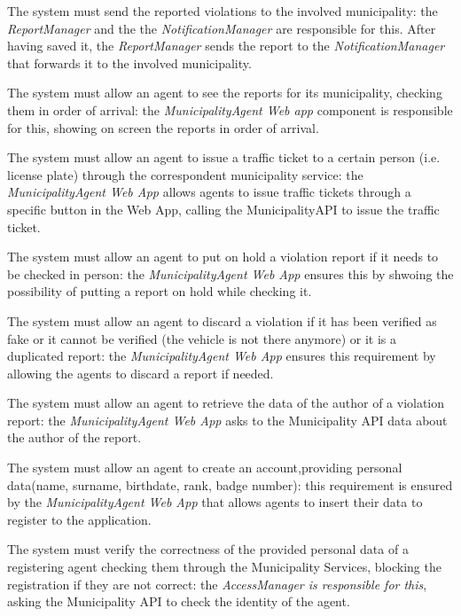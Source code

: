 \documentclass[a4paper]{report}
\begin{document}
\begin{enumerate}[start=1,label={[R\arabic*]}]
\item \label{[R18]}The system must send the reported violations to the involved municipality: the \textit{ReportManager} and the the \textit{NotificationManager} are responsible for this. After having saved it, the \textit{ReportManager} sends the report to the \textit{NotificationManager} that forwards it to the involved municipality.
\item \label{[R19]}The system must allow an agent to see the reports for its municipality, checking them in order of arrival: the \textit{MunicipalityAgent Web app} component is responsible for this, showing on screen the reports in order of arrival.
\item \label{[R20]}The system must allow an agent to issue a traffic ticket to a certain person (i.e. license plate) through the correspondent municipality service: the \textit{MunicipalityAgent Web App}  allows agents to issue traffic tickets through a specific button in the Web App, calling the MunicipalityAPI to issue the traffic ticket.
\item \label{[R21]}The system must allow an agent to put on hold a violation report if it needs to be checked in person: the \textit{MunicipalityAgent Web App} ensures this by shwoing the possibility of putting a report on hold while checking it.
\item \label{[R22]}The system must allow an agent to discard a violation if it has been verified as fake or it cannot be verified (the vehicle is not there anymore) or it is a duplicated report: the \textit{MunicipalityAgent Web App} ensures this requirement by allowing the agents to discard a report if needed.
\item \label{[R23]}The system must allow an agent to retrieve the data of the author of a violation report: the \textit{MunicipalityAgent Web App} asks to the Municipality API data about the author of the report. 
\item \label{[R24]}The system must allow an agent to create an account,providing personal data(name, surname, birthdate, rank, badge number): this requirement is ensured by the \textit{MunicipalityAgent Web App} that allows agents to insert their data to register to the application.
\item \label{[R25]}The system must verify the correctness of the provided personal data of a registering agent checking them through the Municipality Services, blocking the registration if they are not correct: the \textit{AccessManager is responsible for this}, asking the Municipality API to check the identity of the agent.

\end{enumerate}
\end{document}
